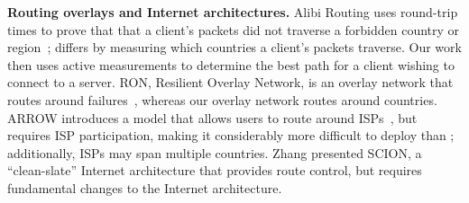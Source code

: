 {\bf Routing overlays and Internet architectures.} Alibi Routing uses
round-trip times to prove that that a client's packets did  not traverse a
forbidden country or region~\cite{levin2015alibi,levin_detour}; \system{} differs by
measuring  which countries a client's packets traverse.  Our
work then  uses active measurements to determine the best path for a client
wishing  to connect to a server.  RON, Resilient Overlay Network, is an
overlay network that  routes around failures~\cite{andersen2001resilient}, whereas our overlay network
routes around countries.  ARROW introduces a
model that allows users to route around ISPs~\cite{peter2015one}, but requires
ISP participation, making it considerably more difficult to deploy than
\system{}; additionally, ISPs may span multiple countries. %
Zhang \ea{} presented SCION, a ``clean-slate'' Internet architecture that
provides route control, but requires fundamental
changes to the Internet architecture. %


